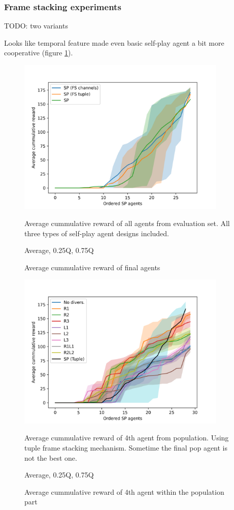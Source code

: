 \subsubsection{Frame stacking experiments}
TODO: two variants

Looks like temporal feature made even basic self-play agent a bit more cooperative (figure \ref{FSVariantsOrderedAvg}).

\begin{figure}[!ht]
    \centering
    \includegraphics*[width=10cm]{../img/FSVariantsOrderedAvg.png}

    \caption{Average cummulative reward of final agents}
    \label{FSVariantsOrderedAvg}
    \medskip
    \small 
    Average cummulative reward of all agents from evaluation set.
    All three types of self-play agent designs included.

    Average, 0.25Q, 0.75Q

\end{figure}

\begin{figure}[!ht]
    \centering
    \includegraphics*[width=10cm]{../img/FSTuple4thOrderedAvg.png}

    \caption{Average cummulative reward of 4th agent within the population part}
    \label{FSTuple4thOrderedAvg}
    \medskip
    \small 
    Average cummulative reward of 4th agent from population.
    Using tuple frame stacking mechanism.
    Sometime the final pop agent is not the best one.

    Average, 0.25Q, 0.75Q

\end{figure}


